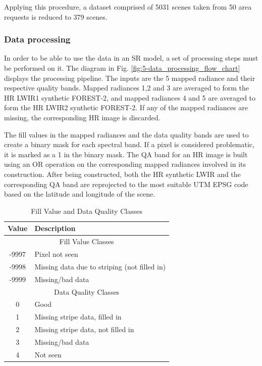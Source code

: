 Applying this procedure, a dataset comprised of 5031 scenes taken from 50 area requests is reduced to 379 scenes.

\subsubsection{Data processing}

In order to be able to use the data in an SR model, a set of processing steps must be performed on it.
The diagram in Fig. \ref{fig:5-data_processing_flow_chart} displays the processing pipeline. The inputs are the 5 mapped radiance and their respective quality bands.
Mapped radiances 1,2 and 3 are averaged to form the HR LWIR1 synthetic FOREST-2, and mapped radiances 4 and 5 are averaged to form the HR LWIR2 synthetic FOREST-2. If any of the mapped radiances are missing, the corresponding HR image is discarded. 

The fill values in the mapped radiances and the data quality bands are used to create a binary mask for each spectral band. If a pixel is considered problematic, it is marked as a 1 in the binary mask. The QA band for an HR image is built using an OR operation on the corresponding mapped radiances involved in its construction. After being constructed, both the HR synthetic LWIR and the corresponding QA band are reprojected to the most suitable UTM EPSG code based on the latitude and longitude of the scene.

\begin{table}[H]
    \centering
    
    \label{tab:quality_classes}
    \begin{tabular}{cl}
        \toprule
        \textbf{Value} & \textbf{Description}                \\
        \midrule
        \multicolumn{2}{c}{Fill Value Classes}                \\
        -9997          & Pixel not seen                       \\
        -9998          & Missing data due to striping (not filled in) \\
        -9999          & Missing/bad data                     \\
        \midrule
        \multicolumn{2}{c}{Data Quality Classes}              \\
        0              & Good                                 \\
        1              & Missing stripe data, filled in       \\
        2              & Missing stripe data, not filled in   \\
        3              & Missing/bad data                     \\
        4              & Not seen                             \\
        \bottomrule
    \end{tabular}
    \caption{Fill Value and Data Quality Classes}
\end{table}

